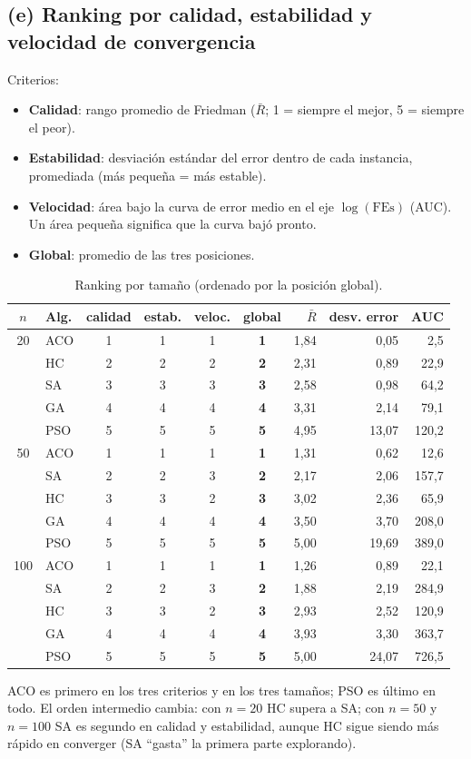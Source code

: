 \documentclass[11pt,a4paper]{article}
\begin{document}
\subsection{(e) Ranking por calidad, estabilidad y velocidad de convergencia}
Criterios:
\begin{itemize}
\item \textbf{Calidad}: rango promedio de Friedman ($\bar R$; 1 = siempre el mejor, 5 = siempre el peor).
\item \textbf{Estabilidad}: desviación estándar del error dentro de cada instancia, promediada (más pequeña = más estable).
\item \textbf{Velocidad}: área bajo la curva de error medio en el eje $\log(\text{FEs})$ (AUC). Un área pequeña significa que la curva bajó pronto.
\item \textbf{Global}: promedio de las tres posiciones.
\end{itemize}
\begin{table}[H]\centering\small
\begin{tabular}{clccccrrr}
\toprule
$n$ & Alg. & calidad & estab. & veloc. & global & $\bar R$ & desv. error & AUC \\
\midrule
20 & ACO & 1 & 1 & 1 & \textbf{1} & 1{,}84 & 0{,}05 & 2{,}5 \\
 & HC & 2 & 2 & 2 & \textbf{2} & 2{,}31 & 0{,}89 & 22{,}9 \\
 & SA & 3 & 3 & 3 & \textbf{3} & 2{,}58 & 0{,}98 & 64{,}2 \\
 & GA & 4 & 4 & 4 & \textbf{4} & 3{,}31 & 2{,}14 & 79{,}1 \\
 & PSO & 5 & 5 & 5 & \textbf{5} & 4{,}95 & 13{,}07 & 120{,}2 \\
\midrule
50 & ACO & 1 & 1 & 1 & \textbf{1} & 1{,}31 & 0{,}62 & 12{,}6 \\
 & SA & 2 & 2 & 3 & \textbf{2} & 2{,}17 & 2{,}06 & 157{,}7 \\
 & HC & 3 & 3 & 2 & \textbf{3} & 3{,}02 & 2{,}36 & 65{,}9 \\
 & GA & 4 & 4 & 4 & \textbf{4} & 3{,}50 & 3{,}70 & 208{,}0 \\
 & PSO & 5 & 5 & 5 & \textbf{5} & 5{,}00 & 19{,}69 & 389{,}0 \\
\midrule
100 & ACO & 1 & 1 & 1 & \textbf{1} & 1{,}26 & 0{,}89 & 22{,}1 \\
 & SA & 2 & 2 & 3 & \textbf{2} & 1{,}88 & 2{,}19 & 284{,}9 \\
 & HC & 3 & 3 & 2 & \textbf{3} & 2{,}93 & 2{,}52 & 120{,}9 \\
 & GA & 4 & 4 & 4 & \textbf{4} & 3{,}93 & 3{,}30 & 363{,}7 \\
 & PSO & 5 & 5 & 5 & \textbf{5} & 5{,}00 & 24{,}07 & 726{,}5 \\
\bottomrule
\end{tabular}

\caption{Ranking por tamaño (ordenado por la posición global).}
\end{table}
ACO es primero en los tres criterios y en los tres tamaños; PSO es último en todo. El orden intermedio cambia: con $n=20$ HC supera a SA; con $n=50$ y $n=100$
SA es segundo en calidad y estabilidad, aunque HC sigue siendo más rápido en converger (SA ``gasta'' la primera parte explorando).
\end{document}
